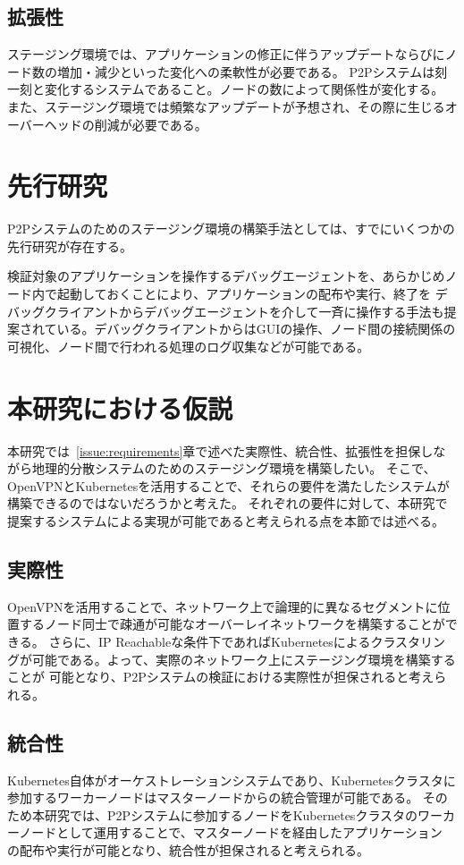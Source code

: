 \subsection{拡張性}
\label{issue:requirements3}
ステージング環境では、アプリケーションの修正に伴うアップデートならびにノード数の増加・減少といった変化への柔軟性が必要である。
P2Pシステムは刻一刻と変化するシステムであること。ノードの数によって関係性が変化する。
また、ステージング環境では頻繁なアップデートが予想され、その際に生じるオーバーヘッドの削減が必要である。

\section{先行研究}
\label{issue:previous-research}
P2Pシステムのためのステージング環境の構築手法としては、すでにいくつかの先行研究が存在する。

検証対象のアプリケーションを操作するデバッグエージェントを、あらかじめノード内で起動しておくことにより、アプリケーションの配布や実行、終了を
デバッグクライアントからデバッグエージェントを介して一斉に操作する手法も提案されている。デバッグクライアントからはGUIの操作、ノード間の接続関係の
可視化、ノード間で行われる処理のログ収集などが可能である。


\section{本研究における仮説}
\label{issue:hypothesis}
本研究では~\ref{issue:requirements}章で述べた実際性、統合性、拡張性を担保しながら地理的分散システムのためのステージング環境を構築したい。
そこで、OpenVPNとKubernetesを活用することで、それらの要件を満たしたシステムが構築できるのではないだろうかと考えた。
それぞれの要件に対して、本研究で提案するシステムによる実現が可能であると考えられる点を本節では述べる。

\subsection{実際性}
OpenVPNを活用することで、ネットワーク上で論理的に異なるセグメントに位置するノード同士で疎通が可能なオーバーレイネットワークを構築することができる。
さらに、IP Reachableな条件下であればKubernetesによるクラスタリングが可能である。よって、実際のネットワーク上にステージング環境を構築することが
可能となり、P2Pシステムの検証における実際性が担保されると考えられる。

\subsection{統合性}
Kubernetes自体がオーケストレーションシステムであり、Kubernetesクラスタに参加するワーカーノードはマスターノードからの統合管理が可能である。
そのため本研究では、P2Pシステムに参加するノードをKubernetesクラスタのワーカーノードとして運用することで、マスターノードを経由したアプリケーション
の配布や実行が可能となり、統合性が担保されると考えられる。

